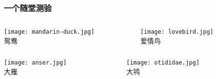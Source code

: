 \documentclass[UTF8,lualatex]{ctexbeamer}
\begin{document}

\begin{frame}
    \frametitle{一个随堂测验}
    \small
    \begin{columns}
        \begin{column}{.48\textwidth}
            \begin{center}
                \texttt{[image: mandarin-duck.jpg]}
                \\
                鸳鸯
            \end{center}
        \end{column}
        \begin{column}{.48\textwidth}
            \begin{center}
                \texttt{[image: lovebird.jpg]}
                \\
                爱情鸟
            \end{center}
        \end{column}
    \end{columns}
    \begin{columns}
        \begin{column}{.48\textwidth}
            \begin{center}
                \texttt{[image: anser.jpg]}
                \\
                大雁
            \end{center}
        \end{column}
        \begin{column}{.48\textwidth}
            \begin{center}
                \texttt{[image: otididae.jpg]}
                \\
                大鸨
            \end{center}
        \end{column}
    \end{columns}
\end{frame}
\end{document}
